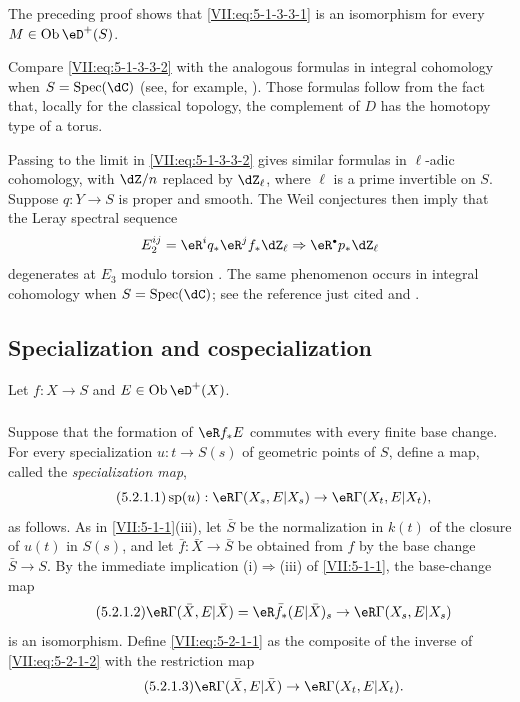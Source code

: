 \documentclass[12pt,oneside,english]{smfbook}
\DeclareMathOperator{\ob}{Ob}
\DeclareMathOperator{\spe}{sp} %
\DeclareMathOperator{\spec}{Spec}
\let\oldbullet\bullet
\renewcommand{\bullet}{\textnormal{\tiny$\oldbullet$}}
\begin{document}
The preceding proof shows that \eqref{VII:eq:5-1-3-3-1} is an isomorphism for every $M\in\ob\eD^+(S)$.

Compare \eqref{VII:eq:5-1-3-3-2} with the analogous formulas in integral cohomology when $S=\spec(\dC)$ (see, for example, \cite[3.1]{de71-2}). Those formulas follow from the fact that, locally for the classical topology, the complement of $D$ has the homotopy type of a torus.

Passing to the limit in \eqref{VII:eq:5-1-3-3-2} gives similar formulas in $\ell$-adic cohomology, with $\dZ/n$ replaced by $\dZ_\ell$, where $\ell$ is a prime invertible on $S$. Suppose $q:Y\to S$ is proper and smooth. The Weil conjectures \cite{de74,de80} then imply that the Leray spectral sequence
\[
  E_2^{i j} = \eR^i q_\ast \eR^j f_\ast \dZ_\ell \Rightarrow \eR^\bullet p_\ast \dZ_\ell
\]
degenerates at $E_3$ modulo torsion \cite[\S6]{de71-1}. The same phenomenon occurs in integral cohomology when $S=\spec(\dC)$; see the reference just cited and \cite[3.2.13]{de71-2}.

\subsection{Specialization and cospecialization}\label{VII:5-2}

Let $f:X\to S$ and $E\in\ob\eD^+(X)$.

\subsubsection{}\label{VII:5-2-1}

Suppose that the formation of $\eR f_\ast E$ commutes with every finite base change. For every specialization $u:t\to S(s)$ of geometric points of $S$, define a map, called the \emph{specialization map},
\begin{equation*}\tag{5.2.1.1}\label{VII:eq:5-2-1-1}
  \spe(u):\eR\Gamma(X_s,E|X_s) \to \eR\Gamma(X_t,E|X_t) \text{,}
\end{equation*}
as follows. As in \ref{VII:5-1-1}(iii), let $\bar S$ be the normalization in $k(t)$ of the closure of $u(t)$ in $S(s)$, and let $\bar f:\bar X\to\bar S$ be obtained from $f$ by the base change $\bar S\to S$. By the immediate implication (i)$\Rightarrow$(iii) of \ref{VII:5-1-1}, the base-change map
\begin{equation*}\tag{5.2.1.2}\label{VII:eq:5-2-1-2}
  \eR\Gamma(\bar X,E|\bar X)=\eR\bar f_\ast (E|\bar X)_s \to \eR\Gamma(X_s,E|X_s)
\end{equation*}
is an isomorphism. Define \eqref{VII:eq:5-2-1-1} as the composite of the inverse of \eqref{VII:eq:5-2-1-2} with the restriction map
\begin{equation*}\tag{5.2.1.3}\label{VII:eq:5-2-1-3}
  \eR\Gamma(\bar X,E|\bar X) \to \eR\Gamma(X_t,E|X_t) \text{.}
\end{equation*}
\end{document}

